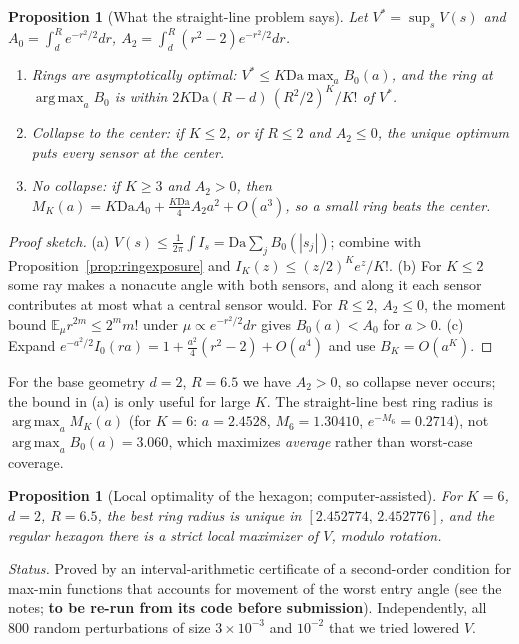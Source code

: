 \documentclass[11pt]{article}
\newtheorem{proposition}[theorem]{Proposition}
\theoremstyle{remark}
\newcommand{\E}{\mathbb{E}}
\newcommand{\Da}{\mathrm{Da}}
\DeclareMathOperator*{\argmax}{arg\,max}
\begin{document}
\begin{proposition}[What the straight-line problem says]\label{prop:straight}
Let $V^*=\sup_sV(s)$ and $A_0=\int_d^Re^{-r^2/2}dr$, $A_2=\int_d^R(r^2-2)e^{-r^2/2}dr$.
\begin{enumerate}[label=(\alph*)]
\item \emph{Rings are asymptotically optimal:}
$V^*\le K\Da\max_aB_0(a)$, and the ring at $\argmax_a B_0$ is within
$2K\Da(R-d)\,(R^2/2)^K/K!$ of $V^*$.
\item \emph{Collapse to the center:} if $K\le2$, or if $R\le2$ and $A_2\le0$, the unique
optimum puts every sensor at the center.
\item \emph{No collapse:} if $K\ge3$ and $A_2>0$, then
$M_K(a)=K\Da A_0+\tfrac{K\Da}{4}A_2a^2+O(a^3)$, so a small ring beats the center.
\end{enumerate}
\end{proposition}
\begin{proof}[Proof sketch]
(a) $V(s)\le\frac1{2\pi}\int I_s=\Da\sum_jB_0(|s_j|)$; combine with
Proposition~\ref{prop:ringexposure} and $I_K(z)\le (z/2)^Ke^z/K!$.
(b) For $K\le2$ some ray makes a nonacute angle with both sensors, and along it each sensor
contributes at most what a central sensor would. For $R\le2$, $A_2\le0$, the moment bound
$\E_\mu r^{2m}\le2^mm!$ under $\mu\propto e^{-r^2/2}dr$ gives $B_0(a)<A_0$ for $a>0$.
(c) Expand $e^{-a^2/2}I_0(ra)=1+\tfrac{a^2}{4}(r^2-2)+O(a^4)$ and use $B_K=O(a^K)$.
\end{proof}
For the base geometry $d=2$, $R=6.5$ we have $A_2>0$, so collapse never occurs; the bound in
(a) is only useful for large $K$. The straight-line best ring radius is
$\argmax_aM_K(a)$ (for $K=6$: $a=2.4528$, $M_6=1.30410$, $e^{-M_6}=0.2714$), not
$\argmax_aB_0(a)=3.060$, which maximizes \emph{average} rather than worst-case coverage.

\begin{proposition}[Local optimality of the hexagon; computer-assisted]\label{prop:local}
For $K=6$, $d=2$, $R=6.5$, the best ring radius is unique in $[2.452774,\,2.452776]$, and the
regular hexagon there is a strict local maximizer of $V$, modulo rotation.
\end{proposition}
\noindent\emph{Status.} Proved by an interval-arithmetic certificate of a second-order
condition for max-min functions that accounts for movement of the worst entry angle
(see the notes; \textbf{to be re-run from its code before submission}). Independently, all
800 random perturbations of size $3\times10^{-3}$ and $10^{-2}$ that we tried lowered $V$.
\end{document}

